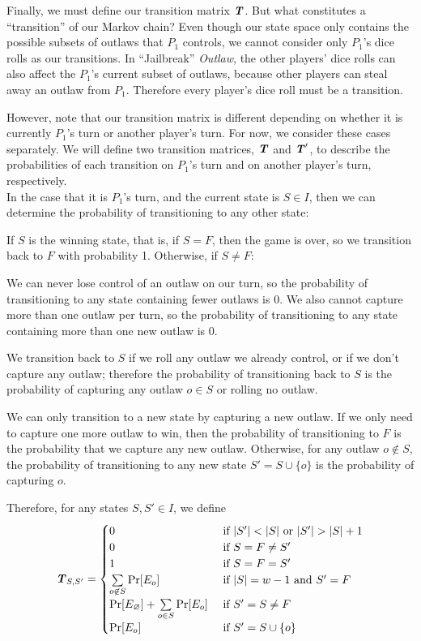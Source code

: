 \documentclass{article}
\newcommand{\T}{\textbf{\textit{T}}}
\theoremstyle{definition}
\theoremstyle{plain}
\begin{document}
	Finally, we must define our transition matrix $\T$. But what constitutes a ``transition'' of our Markov chain? Even though our state space only contains the possible subsets of outlaws that $P_1$ controls, we cannot consider only $P_1$'s dice rolls as our transitions. In ``Jailbreak'' \textit{Outlaw}, the other players' dice rolls can also affect the $P_1$'s current subset of outlaws, because other players can steal away an outlaw from $P_1$. Therefore every player's dice roll must be a transition.

	However, note that our transition matrix is different depending on whether it is currently $P_1$'s turn or another player's turn. For now, we consider these cases separately. We will define two transition matrices, $\T$ and $\T'$, to describe the probabilities of each transition on $P_1$'s turn and on another player's turn, respectively.\\


	In the case that it is $P_1$'s turn, and the current state is $S \in I$, then we can determine the probability of transitioning to any other state:

	If $S$ is the winning state, that is, if $S = F$, then the game is over, so we transition back to $F$ with probability 1. Otherwise, if $S \neq F$:

	We can never lose control of an outlaw on our turn, so the probability of transitioning to any state containing fewer outlaws is 0. We also cannot capture more than one outlaw per turn, so the probability of transitioning to any state containing more than one new outlaw is 0.

	We transition back to $S$ if we roll any outlaw we already control, or if we don't capture any outlaw; therefore the probability of transitioning back to $S$ is the probability of capturing any outlaw $o \in S$ or rolling no outlaw.

	We can only transition to a new state by capturing a new outlaw. If we only need to capture one more outlaw to win, then the probability of transitioning to $F$ is the probability that we capture any new outlaw. Otherwise, for any outlaw $o \not \in S$, the probability of transitioning to any new state $S' = S \cup \{o\}$ is the probability of capturing $o$.

	Therefore, for any states $S, S' \in I$, we define \[\T_{S, S'} =
	\begin{cases}
	0 &\text{ if $|S'| < |S|$ or $|S'| > |S| + 1$}\\
	0 &\text{ if $S = F \neq S'$}\\
	1 &\text{ if $S = F = S'$}\\
	\sum\limits_{o \not \in S} \Pr[E_o] &\text{ if $|S| = w - 1$ and $S' = F$}\\
	\Pr[E_\varnothing] + \sum\limits_{o \in S} \Pr[E_o] &\text{ if $S' = S \neq F$}\\
	\Pr[E_o] &\text{ if $S' = S \cup \{o\}$}
	\end{cases}\]
\end{document}
